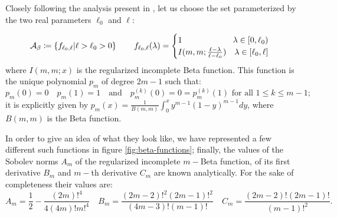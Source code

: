 Closely following the analysis present in \cite[]{fewster2020new}, let us choose the set parameterized by the two real parameters \(\ell_0\) and \(\ell\):

\[
\mathcal{A}_{\beta} \coloneqq \left\{f_{\ell_0, \ell} \vert \ell > \ell_0 >0\right\} \quad\quad f_{\ell_0, \ell}(\lambda) = 
\begin{cases}
	1 \hfill \lambda\in [0, \ell_0) \\
	I(m, m; \frac{\ell - \lambda}{\ell - \ell_0}) \quad \hfill \lambda\in [\ell_0, \ell]
\end{cases}
\]
where \(I(m,m;x)\) is the regularized incomplete Beta function. This function is the unique polynomial \(p_m\) of degree \(2m - 1\) such that:
\[
p_m(0) = 0 \quad p_m(1) = 1 \quad\text{and}\quad p^{(k)}_m(0) = 0 = p^{(k)}_m(1)	\text{ for all } 1 \le k \le m - 1;
\]
it is explicitly given by \(p_m(x) = \frac{1}{B(m, m)} \int_0^x y^{m - 1}(1 - y)^{m -1} dy\), where \(B(m,m)\) is the Beta function.

In order to give an idea of what they look like, we have represented a few different such functions in figure \ref{fig:beta-functions}; finally, the values of the Sobolev norms \(A_m\) of the regularized incomplete \(m-\)Beta function, of its first derivative \(B_m\) and \(m-\)th derivative \(C_m\) are known analytically. For the sake of completeness their values are:
\[
A_m = \frac{1}{2} - \frac{(2m)!^4}{4(4m)!m!^4} \quad 
B_m= \frac{(2m-2)!^2(2m-1)!^2}{(4m-3)!(m - 1)!} \quad 
C_m = \frac{(2m-2)!(2m-1)!}{(m-1)!^2}. 
\]


